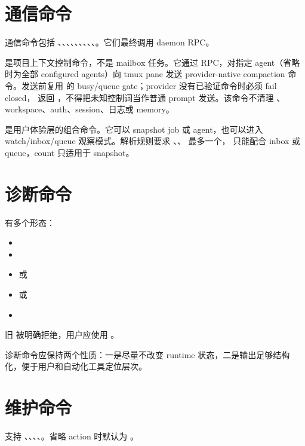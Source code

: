 \section{通信命令}

通信命令包括 、、、、、、、、、。它们最终调用 daemon RPC。

 是项目上下文控制命令，不是 mailbox 任务。它通过
 RPC，对指定 agent（省略时为全部 configured
agents）向 tmux pane 发送 provider-native compaction 命令。发送前复用
 的 busy/queue gate；provider 没有已验证命令时必须 fail closed，
返回 ，不得把未知控制词当作普通 prompt 发送。该命令不清理
、workspace、auth、session、日志或 memory。

 是用户体验层的组合命令。它可以 snapshot job 或 agent，也可以进入 watch/inbox/queue 观察模式。解析规则要求 、、 最多一个， 只能配合 inbox 或 queue，count 只适用于 snapshot。

\section{诊断命令}

 有多个形态：

\begin{itemize}
  \item {}
  \item {}
  \item {} 或 
  \item {} 或 
  \item {}
\end{itemize}

旧  被明确拒绝，用户应使用 。

诊断命令应保持两个性质：一是尽量不改变 runtime 状态，二是输出足够结构化，便于用户和自动化工具定位层次。

\section{维护命令}

 支持 、、、、。省略 action 时默认为 。

